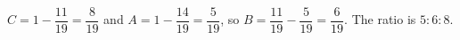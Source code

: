 $C=1-\dfrac{11}{19}=\dfrac8{19}$ and $A=1-\dfrac{14}{19}=\dfrac5{19}$, so $B=\dfrac{11}{19}-\dfrac5{19}=\dfrac6{19}$. The ratio is $\boxed{5:6:8}$.
